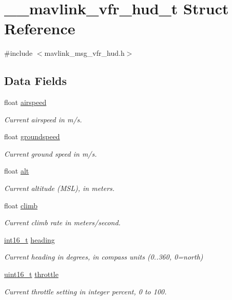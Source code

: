 \hypertarget{struct____mavlink__vfr__hud__t}{\section{\-\_\-\-\_\-mavlink\-\_\-vfr\-\_\-hud\-\_\-t Struct Reference}
\label{struct____mavlink__vfr__hud__t}
}


{\ttfamily \#include $<$mavlink\-\_\-msg\-\_\-vfr\-\_\-hud.\-h$>$}

\subsection*{Data Fields}
\begin{DoxyCompactItemize}
\item 
float \hyperlink{struct____mavlink__vfr__hud__t_a78714d39e0dd6db7448c6633442a9e00}{airspeed}
\begin{DoxyCompactList}\small\item\em Current airspeed in m/s. \end{DoxyCompactList}\item 
float \hyperlink{struct____mavlink__vfr__hud__t_aecadd708f2c0aee3193f00bd22711730}{groundspeed}
\begin{DoxyCompactList}\small\item\em Current ground speed in m/s. \end{DoxyCompactList}\item 
float \hyperlink{struct____mavlink__vfr__hud__t_a7a6c968281e1518a001e32e24424a8da}{alt}
\begin{DoxyCompactList}\small\item\em Current altitude (M\-S\-L), in meters. \end{DoxyCompactList}\item 
float \hyperlink{struct____mavlink__vfr__hud__t_a3b87f500e3394aef4c26d05435f1e7ba}{climb}
\begin{DoxyCompactList}\small\item\em Current climb rate in meters/second. \end{DoxyCompactList}\item 
\hyperlink{stdint_8h_aa343fa3b3d06292b959ffdd4c4703b06}{int16\-\_\-t} \hyperlink{struct____mavlink__vfr__hud__t_a54e333ab2f24a5340e8bd5cbfa91db15}{heading}
\begin{DoxyCompactList}\small\item\em Current heading in degrees, in compass units (0..360, 0=north) \end{DoxyCompactList}\item 
\hyperlink{stdint_8h_a273cf69d639a59973b6019625df33e30}{uint16\-\_\-t} \hyperlink{struct____mavlink__vfr__hud__t_ae73bae71b52e32eb61edb4fbccac319c}{throttle}
\begin{DoxyCompactList}\small\item\em Current throttle setting in integer percent, 0 to 100. \end{DoxyCompactList}\end{DoxyCompactItemize}


